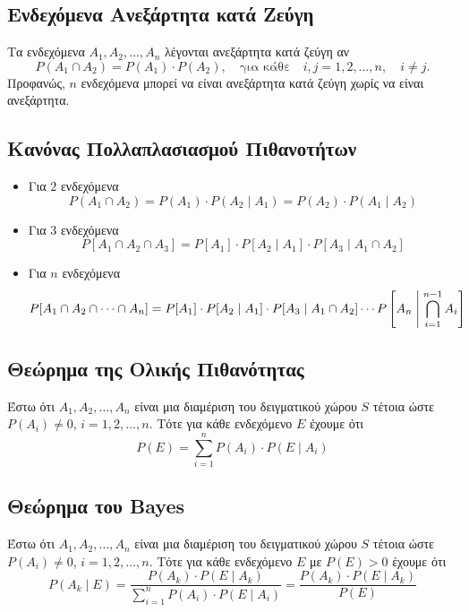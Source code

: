 \subsection*{Ενδεχόμενα Ανεξάρτητα κατά Ζεύγη}

Τα ενδεχόμενα  $A_{1}, A_{2}, \ldots, A_{n}$ λέγονται ανεξάρτητα κατά ζεύγη αν
\[
 P(A_{1} \cap A_{2}) =  P(A_{1}) \cdot P(A_{2}), \quad \text{για κάθε} \quad i,j = 1,2, \ldots, n, \quad i \neq j.
\]
 Προφανώς, $n$ ενδεχόμενα μπορεί να είναι ανεξάρτητα κατά ζεύγη χωρίς να είναι ανεξάρτητα.

\subsection*{Κανόνας Πολλαπλασιασμού Πιθανοτήτων}

\begin{itemize}
  \item Για $2$ ενδεχόμενα
\[
P(A_{1} \cap A_{2}) = P(A_{1}) \cdot P(A_{2} \mid A_{1}) = P(A_{2}) \cdot P(A_{1} \mid A_{2})
\]

\item Για $3$ ενδεχόμενα
\[
P[A_{1} \cap A_{2} \cap A_{3}] = P[A_{1}] \cdot P[A_{2} \mid A_{1}] \cdot P[A_{3} \mid A_{1} \cap A_{2}]
\]

\item Για $n$ ενδεχόμενα
\[
P[A_{1} \cap A_{2} \cap \cdots \cap A_{n}] = P[A_{1}] \cdot P[A_{2} \mid A_{1}] \cdot P[A_{3} \mid A_{1} \cap A_{2}] \cdots P\left[A_{n} \Biggm| \bigcap\limits_{i=1}^{n-1} A_{i}\right]
\]
\end{itemize}

\subsection*{Θεώρημα της Ολικής Πιθανότητας}

Έστω ότι $A_{1}, A_{2}, \ldots, A_{n}$ είναι μια διαμέριση του δειγματικού χώρου $S$ τέτοια ώστε $P(A_{i}) \neq 0$, $i = 1,2, \ldots, n$. Τότε για κάθε ενδεχόμενο $E$ έχουμε ότι
\[
P(E) = \sum_{i=1}^{n}P(A_{i}) \cdot P(E \mid A_{i})
\]

\subsection*{Θεώρημα του \textlatin{Bayes}}
Έστω ότι $A_{1}, A_{2}, \ldots, A_{n}$ είναι μια διαμέριση του δειγματικού χώρου $S$ τέτοια ώστε $P(A_{i}) \neq 0$, $i = 1,2, \ldots, n$. Τότε για κάθε ενδεχόμενο $E$ με $P(E) > 0$ έχουμε ότι
\[
P(A_{k} \mid E) = \frac{P(A_{k}) \cdot P(E \mid A_{k})}{\sum_{i=1}^{n}P(A_{i}) \cdot P(E \mid A_{i})} = \frac{P(A_{k}) \cdot P(E \mid A_{k})}{P(E)}
\]
